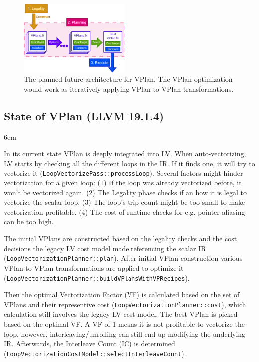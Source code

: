 \documentclass[sigplan,11pt,nonacm]{acmart}
\begin{document}
\begin{figure}
  \centering
  \includegraphics[width=0.475\textwidth]{images/vplan-future.png}
  \caption{The planned future architecture for VPlan. The VPlan optimization would
  work as iteratively applying VPlan-to-VPlan transformations.}
  \label{fig:vplan-future}
\end{figure}

\subsection{State of VPlan (LLVM 19.1.4)}
\emergencystretch 6em

In its current state VPlan is deeply integrated into LV.
When auto-vectorizing, LV starts by checking all the different loops in the IR.
If it finds one, it will try to vectorize it (\texttt{LoopVectorizePass::\allowbreak processLoop}).
Several factors might hinder vectorization for a given loop: 
(1) If the loop was already vectorized before, it won't be vectorized again. 
(2) The Legality phase checks if an how it is legal to vectorize the scalar
loop. (3) The loop's trip count might be too small to make vectorization profitable. (4) The cost
of runtime checks for e.g. pointer aliasing can be too high.

The initial VPlans are constructed based on the legality checks and the cost decisions the legacy
LV cost model made referencing the scalar IR (\texttt{LoopVectorizationPlanner::\allowbreak plan}).
After initial VPlan construction various VPlan-to-VPlan transformations are applied to optimize
it (\texttt{LoopVectorizationPlanner::\allowbreak buildVPlansWithVPRecipes}).

Then the optimal Vectorization Factor (VF) is calculated based on the set of VPlans and their
representive cost (\texttt{LoopVectorizationPlanner::\allowbreak cost}), 
which calculation still involves the legacy LV cost model. 
The best VPlan is picked based on the optimal VF. A VF of 1 means it is not
profitable to vectorize the loop, however, interleaving/unrolling can still end up modifying the
underlying IR.
Afterwards, the Interleave Count (IC) is determined 
(\texttt{LoopVectorizationCostModel::\allowbreak selectInterleaveCount}).
\end{document}
